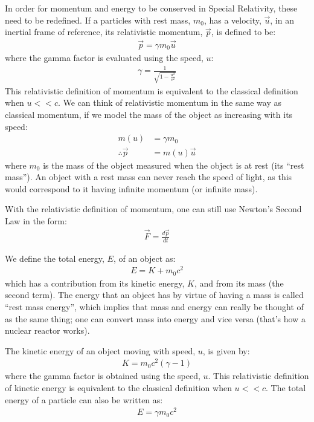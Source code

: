 \begin{chapterSummary}
In order for momentum and energy to be conserved in Special Relativity, these need to be redefined. If a particles with rest mass, $m_0$, has a velocity, $\vec u$, in an inertial frame of reference, its relativistic momentum, $\vec p$, is defined to be:
\begin{align*}
\vec p = \gamma m_0 \vec u
\end{align*}
where the gamma factor is evaluated using the speed, $u$:
\begin{align*}
\gamma = \frac{1}{\sqrt{1-\frac{u^2}{c^2}}}
\end{align*}
This relativistic definition of momentum is equivalent to the classical definition when $u<<c$. We can think of relativistic momentum in the same way as classical momentum, if we model the mass of the object as increasing with its speed:
\begin{align*}
m(u)&=\gamma m_0\\
\therefore \vec p &= m(u) \vec u
\end{align*}
where $m_0$ is the mass of the object measured when the object is at rest (its ``rest mass''). An object with a rest mass can never reach the speed of light, as this would correspond to it having infinite momentum (or infinite mass). 

With the relativistic definition of momentum, one can still use Newton's Second Law in the form:
\begin{align*}
\vec F = \frac{d\vec p}{dt}
\end{align*}

We define the total energy, $E$, of an object as:
\begin{align*}
E = K + m_0c^2
\end{align*}
which  has a contribution from its kinetic energy, $K$, and from its mass (the second term).  The energy that an object has by virtue of having a mass is called ``rest mass energy'', which implies that mass and energy can really be thought of as the same thing; one can convert mass into energy and vice versa (that's how a nuclear reactor works). 

The kinetic energy of an object moving with speed, $u$, is given by:
\begin{align*}
K = m_0c^2 (\gamma -1)
\end{align*}
where the gamma factor is obtained using the speed, $u$. This relativistic definition of kinetic energy is equivalent to the classical definition when $u<<c$. The total energy of a particle can also be written as:
\begin{align*}
E=\gamma m_0 c^2
\end{align*}


\end{chapterSummary}
